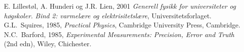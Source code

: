 \begin{thebibliography}{99}

  E. Lillestøl, A. Hunderi og J.R. Lien, 2001 {\it Generell fysikk for universiteter og høgskoler. Bind 2: varmelære og elektrisitetslære\/}, Universitetsforlaget. \\


  G.L.\ Squires, 1985, {\it Practical Physics\/}, Cambridge University Press, Cambridge. 
  N.C.\ Barford, 1985, {\it Experimental Measurements: Precision, Error and Truth\/} (2nd edn), Wiley, Chichester. 


\end{thebibliography}
